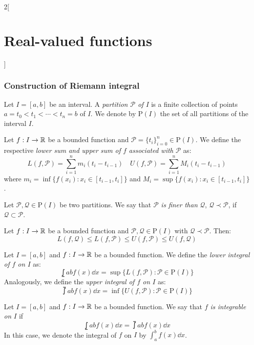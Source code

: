 \documentclass[../../../main.tex]{subfiles}
\begin{document}
\begin{multicols}{2}[\section{Real-valued functions}]
\subsubsection*{Construction of Riemann integral}
\begin{definition}
    Let $I=[a,b]$ be an interval. A \textit{partition $\mathcal{P}$ of $I$} is a finite collection of points $a=t_0<t_1<\cdots<t_n=b$ of $I$. We denote by $\mathrm{P}(I)$ the set of all partitions of the interval $I$.
\end{definition}
\begin{definition}
    Let $f:I\rightarrow\mathbb{R}$ be a bounded function and $\mathcal{P}=\{t_i\}_{i=0}^n\in\mathrm{P}(I)$. We define the respective \textit{lower sum and upper sum of $f$ associated with $\mathcal{P}$} as:
    $$L(f,\mathcal{P})=\sum_{i=1}^nm_i(t_i-t_{i-1})\quad U(f,\mathcal{P})=\sum_{i=1}^nM_i(t_i-t_{i-1})$$
    where $m_i=\inf\{f(x_i):x_i\in[t_{i-1},t_i]\}$ and $M_i=\sup\{f(x_i):x_i\in[t_{i-1},t_i]\}$.
\end{definition}
\begin{definition}
    Let $\mathcal{P},\mathcal{Q}\in\mathrm{P}(I)$ be two partitions. We say that \textit{$\mathcal{P}$ is finer than $\mathcal{Q}$}, $\mathcal{Q}\prec\mathcal{P}$, if $\mathcal{Q}\subset\mathcal{P}$.
\end{definition}
\begin{prop}
    Let $f:I\rightarrow\mathbb{R}$ be a bounded function and $\mathcal{P},\mathcal{Q}\in\mathrm{P}(I)$ with $\mathcal{Q}\prec\mathcal{P}$. Then: $$L(f,\mathcal{Q})\leq L(f,\mathcal{P})\leq U(f,\mathcal{P})\leq U(f,\mathcal{Q})$$
\end{prop}
\begin{definition}
    Let $I=[a,b]$ and $f:I\rightarrow\mathbb{R}$ be a bounded function. We define the \textit{lower integral of $f$ on $I$} as: $$\lowint{a}{b}f(x)\dd x=\sup\{L(f,\mathcal{P}):\mathcal{P}\in\mathrm{P}(I)\}$$ Analogously, we define the \textit{upper integral of $f$ on $I$} as: $$\upint{a}{b}f(x)\dd x=\inf\{U(f,\mathcal{P}):\mathcal{P}\in\mathrm{P}(I)\}$$
\end{definition}
\begin{definition}\label{RVF-integrable}
    Let $I=[a,b]$ and $f:I\rightarrow\mathbb{R}$ be a bounded function. We say that \textit{$f$ is integrable on $I$} if $$\lowint{a}{b}f(x)\dd x=\upint{a}{b}f(x)\dd x$$ In this case, we denote the integral of $f$ on $I$ by $\displaystyle\int_a^b f(x)\dd x$.
\end{definition}
\begin{lemma}

\end{lemma}
\end{multicols}
\end{document}
